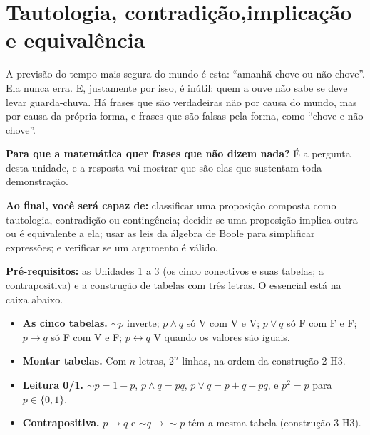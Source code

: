 \providecommand{\nao}{{\sim}}
\clearpage
\section[Tautologia, contradição, implicação e equivalência]{Tautologia, contradição,\newline implicação e equivalência}

\Prefacio
\begin{prefacio}

A previsão do tempo mais segura do mundo é esta: \enquote{amanhã chove ou não chove}. Ela nunca erra. E, justamente por isso, é inútil: quem a ouve não sabe se deve levar guarda-chuva. Há frases que são verdadeiras não por causa do mundo, mas por causa da própria forma, e frases que são falsas pela forma, como \enquote{chove e não chove}.

\textbf{Para que a matemática quer frases que não dizem nada?} É a pergunta desta unidade, e a resposta vai mostrar que são elas que sustentam toda demonstração.

\textbf{Ao final, você será capaz de:} classificar uma proposição composta como tautologia, contradição ou contingência; decidir se uma proposição implica outra ou é equivalente a ela; usar as leis da álgebra de Boole para simplificar expressões; e verificar se um argumento é válido.

\textbf{Pré-requisitos:} as Unidades 1 a 3 (os cinco conectivos e suas tabelas; a contrapositiva) e a construção de tabelas com três letras. O essencial está na caixa abaixo.
\end{prefacio}

\begin{minimo}
\begin{itemize}[leftmargin=1.2em]
  \item \textbf{As cinco tabelas.} ${\nao}p$ inverte; $p\wedge q$ só V com V e V; $p\vee q$ só F com F e F; $p\rightarrow q$ só F com V e F; $p\leftrightarrow q$ V quando os valores são iguais.
  \item \textbf{Montar tabelas.} Com $n$ letras, $2^n$ linhas, na ordem da construção 2-H3.
  \item \textbf{Leitura 0/1.} ${\nao}p=1-p$, $p\wedge q=pq$, $p\vee q=p+q-pq$, e $p^2=p$ para $p\in\{0,1\}$.
  \item \textbf{Contrapositiva.} $p\rightarrow q$ e ${\nao}q\rightarrow{\nao}p$ têm a mesma tabela (construção 3-H3).
\end{itemize}
\end{minimo}

